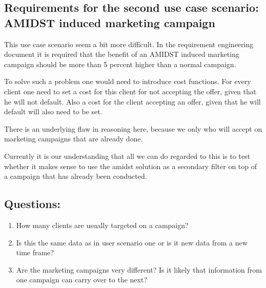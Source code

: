 \documentclass{article}
\theoremstyle{theorem}
\theoremstyle{definition}
\begin{document}
\subsection{Requirements for the second use case scenario:  AMIDST induced marketing campaign}

This use case scenario seem a bit more difficult.  In the requirement engineering document it is required that the benefit of an AMIDST induced marketing campaign should be more than 5 percent higher than a normal campaign. 

To solve such a problem one would need to introduce cost functions.  For every client one need to set a cost for this client for not accepting the offer, given that he will not default.  Also a cost for the client accepting an offer, given that he will default will also need to be set.  

There is an underlying flaw in reasoning here, because we only who will accept on marketing campaigns that are already done.  

Currently it is our understanding that all we can do regarded to this is to test whether it makes sense to use the amidst solution as a secondary filter on top of a campaign that has already been conducted.



\subsection*{Questions: }
\begin{enumerate}
\item How many clients are usually targeted on a campaign?
\item Is this the same data as in user scenario one or is it new data from a new time frame?
\item Are the marketing campaigns very different? Is it likely that information from one campaign can carry over to the next?
\end{enumerate}



\end{document}
